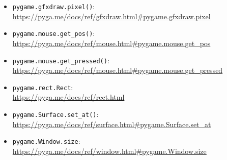 \begin{itemize}
	
	\item \texttt{pygame.gfxdraw.pixel()}:
	\\ \url{https://pyga.me/docs/ref/gfxdraw.html#pygame.gfxdraw.pixel}
	
	\item \texttt{pygame.mouse.get\_pos()}:
	\\
	\url{https://pyga.me/docs/ref/mouse.html#pygame.mouse.get_pos}
	
	\item \texttt{pygame.mouse.get\_pressed()}:
	\\
	\url{https://pyga.me/docs/ref/mouse.html#pygame.mouse.get_pressed}
	
	\item \texttt{pygame.rect.Rect}:
	\\
	\url{https://pyga.me/docs/ref/rect.html}
	
	\item \texttt{pygame.Surface.set\_at()}:
	\\
	\url{https://pyga.me/docs/ref/surface.html#pygame.Surface.set_at}
	
	\item \texttt{pygame.Window.size}:
	\\
	\url{https://pyga.me/docs/ref/window.html#pygame.Window.size}
	
\end{itemize}

